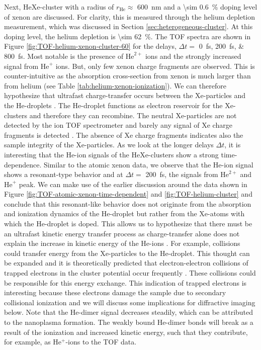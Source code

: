 Next, HeXe-cluster with a radius of $r_{\text{He}}\approx$ \SI{600}{\nano\meter} and a \SI{\sim 0.6}{\percent} doping level of xenon are discussed. For clarity, this is measured through the helium depletion measurement, which was discussed in Section \ref{sec:heterogeneous-cluster}. At this doping level, the helium depletion is \SI{\sim 62}{\percent}. The TOF spectra are shown in Figure \ref{fig:TOF-helium-xenon-cluster-60} for the delays, $\Delta t=$ \SIlist{0;200;800}{\femto\second}. Most notable is the presence of $\text{He}^{2+}$ ions and the strongly increased signal from $\text{He}^{+}$ ions. But, only few xenon charge fragments are observed. This is counter-intuitive as the absorption cross-section from xenon is much larger than from helium (see Table \ref{tab:helium-xenon-ionization}). We can therefore hypothesize that ultrafast charge-transfer occurs between the Xe-particles and the He-droplets \cite{Hoener-2008-JPB}. The He-droplet functions as electron reservoir for the Xe-clusters and therefore they can recombine. The neutral Xe-particles are not detected by the ion TOF spectrometer and barely any signal of Xe charge fragments is detected \cite{Hoener-2008-JPB,Hau-Riege-2007-PRL}. The absence of Xe charge fragments indicates also the sample integrity of the Xe-particles. As we look at the longer delays $\Delta t$, it is interesting that the He-ion signals of the HeXe-clusters show a strong time-dependence. Similar to the atomic xenon data, we observe that the He-ion signal shows a resonant-type behavior and at $\Delta t =$ \SI{200}{\femto\second}, the signals from $\text{He}^{2+}$ and $\text{He}^{+}$ peak. We can make use of the earlier discussion around the data shown in Figure \ref{fig:TOF-atomic-xenon-time-dependent} and \ref{fig:TOF-helium-cluster} and conclude that this resonant-like behavior does not originate from the absorption and ionization dynamics of the He-droplet but rather from the Xe-atoms with which the He-droplet is doped. This allows us to hypothesize that there must be an ultrafast kinetic energy transfer process as charge-transfer alone does not explain the increase in kinetic energy of the He-ions \cite{Hoener-2008-JPB,Sugishima-2012-PRA,Muller-2015-JPhysB}. For example, collisions could transfer energy from the Xe-particles to the He-droplet. This thought can be expanded and it is theoretically predicted that electron-electron collisions of trapped electrons in the cluster potential occur frequently \cite{Arbeiter-2011-NJP}. These collisions could be responsible for this energy exchange. This indication of trapped electrons is interesting because these electrons damage the sample due to secondary collisional ionization \cite{Hau-Riege-2004-PRE} and we will discuss some implications for diffractive imaging below. Note that the He-dimer signal decreases steadily, which can be attributed to the nanoplasma formation. The weakly bound He-dimer bonds will break as a result of the ionization and increased kinetic energy, such that they contribute, for example, as He$^{+}$-ions to the TOF data.\\[1\baselineskip]
